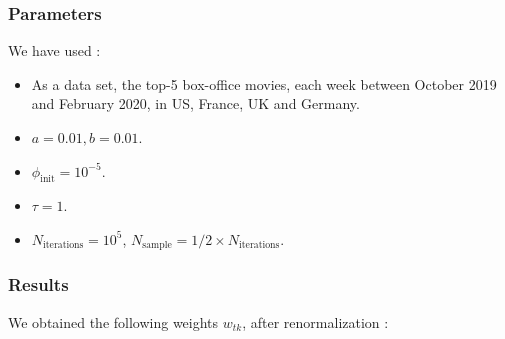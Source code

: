 \documentclass{article}
\begin{document}
\subsubsection{Parameters}

We have used :
\begin{itemize}
\item As a data set, the top-5 box-office movies, each week between October 2019 and February 2020, in US, France, UK and Germany\cite{datamovies}.
\item $a=0.01,b=0.01$.
\item $\phi_\text{init}=10^{-5}$.
\item $\tau=1$.
\item $N_\text{iterations}=10^{5}$, $N_\text{sample}=1/2\times N_\text{iterations}$.
\end{itemize}

\newpage

\subsubsection{Results}

We obtained the following weights $w_{tk}$, after renormalization :
\end{document}

